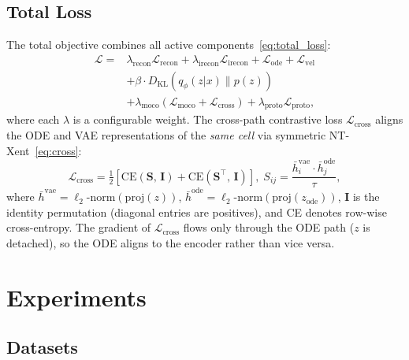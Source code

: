 \documentclass[preprint,12pt,number]{elsarticle}
\begin{document}
\subsection{Total Loss}
\label{sec:method:loss}

The total objective combines all active components~\eqref{eq:total_loss}:
\begin{align}
    \mathcal{L} ={} & \lambda_{\mathrm{recon}} \mathcal{L}_{\mathrm{recon}} + \lambda_{\mathrm{irecon}} \mathcal{L}_{\mathrm{irecon}} + \mathcal{L}_{\mathrm{ode}} + \mathcal{L}_{\mathrm{vel}} \nonumber \\
    & + \beta \cdot D_{\mathrm{KL}}(q_\phi(z|x) \| p(z)) \nonumber \\
    & + \lambda_{\mathrm{moco}} (\mathcal{L}_{\mathrm{moco}} + \mathcal{L}_{\mathrm{cross}}) + \lambda_{\mathrm{proto}} \mathcal{L}_{\mathrm{proto}},
    \label{eq:total_loss}
\end{align}
where each $\lambda$ is a configurable weight. The cross-path contrastive loss $\mathcal{L}_{\mathrm{cross}}$ aligns the ODE and VAE representations of the \emph{same cell} via symmetric NT-Xent~\eqref{eq:cross}:
\begin{equation}
    \mathcal{L}_{\mathrm{cross}} = \tfrac{1}{2}\!\left[\mathrm{CE}(\mathbf{S},\,\mathbf{I}) + \mathrm{CE}(\mathbf{S}^{\!\top}\!,\,\mathbf{I})\right],\;
    S_{ij} = \frac{\bar{h}^{\mathrm{vae}}_i \cdot \bar{h}^{\mathrm{ode}}_j}{\tau},
    \label{eq:cross}
\end{equation}
where $\bar{h}^{\mathrm{vae}} = \ell_2\text{-norm}(\mathrm{proj}(z))$, $\bar{h}^{\mathrm{ode}} = \ell_2\text{-norm}(\mathrm{proj}(z_{\mathrm{ode}}))$, $\mathbf{I}$ is the identity permutation (diagonal entries are positives), and CE denotes row-wise cross-entropy. The gradient of $\mathcal{L}_{\mathrm{cross}}$ flows only through the ODE path ($z$ is detached), so the ODE aligns to the encoder rather than vice versa.

\section{Experiments}
\label{sec:experiments}

\subsection{Datasets}
\label{sec:experiments:datasets}
\end{document}
